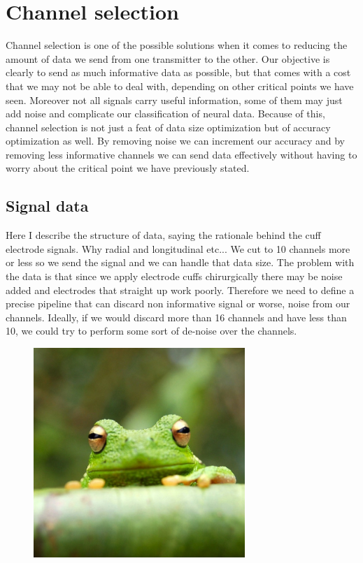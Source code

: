 \documentclass{article}
\begin{document}
\section{Channel selection}

Channel selection is one of the possible solutions when it comes to reducing the amount of data we send from one transmitter to the other.
Our objective is clearly to send as much informative data as possible, but that comes with a cost that we may not be able to deal with, depending on other critical points we have seen.
Moreover not all signals carry useful information, some of them may just add noise and complicate our classification of neural data.
Because of this, channel selection is not just a feat of data size optimization but of accuracy optimization as well.
By removing noise we can increment our accuracy and by removing less informative channels we can send data effectively without having to worry about the critical point we have previously stated.

\subsection{Signal data}

Here I describe the structure of data, saying the rationale behind the cuff electrode signals.
Why radial and longitudinal etc...
We cut to 10 channels more or less so we send the signal and we can handle that data size.
The problem with the data is that since we apply electrode cuffs chirurgically there may be noise added and electrodes that straight up work poorly.
Therefore we need to define a precise pipeline that can discard non informative signal or worse, noise from our channels.
Ideally, if we would discard more than 16 channels and have less than 10, we could try to perform some sort of de-noise over the channels.


\begin{figure}[h]
      \includegraphics[width=8cm]{Images/frog.jpg}
\end{figure}
\end{document}
